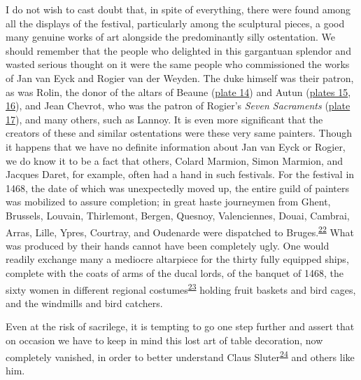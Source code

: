 I do not wish to cast doubt that, in spite of everything, there were
found among all the displays of the festival, particularly among the
sculptural pieces, a good many genuine works of art alongside the
predominantly silly ostentation. We should remember that the people who
delighted in this gargantuan splendor and wasted serious thought on it
were the same people who commissioned the works of Jan van Eyck and
Rogier van der Weyden. The duke himself was their patron, as was Rolin,
the donor of the altars of Beaune
(\protect\hyperlink{20_ILLUSTRATIONS_FOLLOW_PAGE.xhtmlux5cux23id_2298}{plate
14}) and Autun
(\protect\hyperlink{20_ILLUSTRATIONS_FOLLOW_PAGE.xhtmlux5cux23id_15}{plates
15},
\protect\hyperlink{20_ILLUSTRATIONS_FOLLOW_PAGE.xhtmlux5cux23id_16}{16}),
and Jean
\protect\hypertarget{20_ILLUSTRATIONS_FOLLOW_PAGE.xhtmlux5cux23page_307}{}{}Chevrot,
who was the patron of Rogier's \emph{Seven Sacraments}
(\protect\hyperlink{20_ILLUSTRATIONS_FOLLOW_PAGE.xhtmlux5cux23id_17}{plate
17}), and many others, such as Lannoy. It is even more significant that
the creators of these and similar ostentations were these very same
painters. Though it happens that we have no definite information about
Jan van Eyck or Rogier, we do know it to be a fact that others, Colard
Marmion, Simon Marmion, and Jacques Daret, for example, often had a hand
in such festivals. For the festival in 1468, the date of which was
unexpectedly moved up, the entire guild of painters was mobilized to
assure completion; in great haste journeymen from Ghent, Brussels,
Louvain, Thirlemont, Bergen, Quesnoy, Valenciennes, Douai, Cambrai,
Arras, Lille, Ypres, Courtray, and Oudenarde were dispatched to
Bruges.\textsuperscript{\protect\hypertarget{20_ILLUSTRATIONS_FOLLOW_PAGE.xhtmlux5cux23id_429}{\protect\hyperlink{23_NOTES.xhtmlux5cux23id_430}{22}}}
What was produced by their hands cannot have been completely ugly. One
would readily exchange many a mediocre altarpiece for the thirty fully
equipped ships, complete with the coats of arms of the ducal lords, of
the banquet of 1468, the sixty women in different regional
costumes\textsuperscript{\protect\hypertarget{20_ILLUSTRATIONS_FOLLOW_PAGE.xhtmlux5cux23id_427}{\protect\hyperlink{23_NOTES.xhtmlux5cux23id_428}{23}}}
holding fruit baskets and bird cages, and the windmills and bird
catchers.

Even at the risk of sacrilege, it is tempting to go one step further and
assert that on occasion we have to keep in mind this lost art of table
decoration, now completely vanished, in order to better understand Claus
Sluter\textsuperscript{\protect\hypertarget{20_ILLUSTRATIONS_FOLLOW_PAGE.xhtmlux5cux23id_425}{\protect\hyperlink{23_NOTES.xhtmlux5cux23id_426}{24}}}
and others like him.

